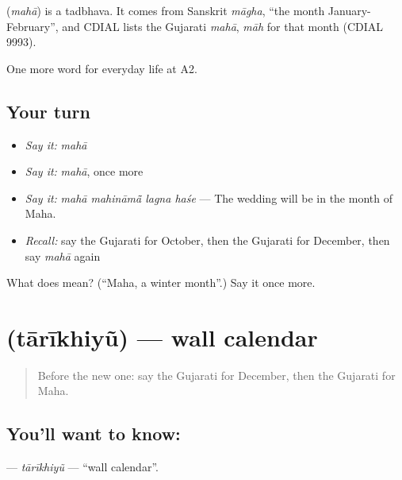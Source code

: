 \begin{cousinweb}
\textbf{} (\emph{mahā}) is a tadbhava. It comes from Sanskrit \emph{māgha}, \textquotedblleft{}the month January-February\textquotedblright{}, and CDIAL lists the Gujarati \emph{mahā}, \emph{māh} for that month (CDIAL 9993).
\end{cousinweb}

\begin{grammarlens}[title={What you've built}]
One more word for everyday life at A2.
\end{grammarlens}

\subsection*{Your turn}
\begin{itemize}
\raggedright
  \item \emph{Say it:} \emph{mahā}
  \item \emph{Say it:} \emph{mahā}, once more
  \item \emph{Say it:} \emph{mahā mahināmā̃ lagna haśe} — The wedding will be in the month of Maha.
  \item \emph{Recall:} say the Gujarati for October, then the Gujarati for December, then say \emph{mahā} again
\end{itemize}

\begin{tcolorbox}[breakable,colback=teal!4,colframe=teal!35!black,title={Before you move on}]
What does  mean? (\textquotedblleft{}Maha, a winter month\textquotedblright{}.) Say it once more.
\end{tcolorbox}
\section[\texorpdfstring{\gu{તારીખિયું} (tārīkhiyũ)}{તારીખિયું (tārīkhiyũ)}]{ (tārīkhiyũ) — wall calendar}

\label{lesson:GU-C174-tarikhiyu}



\begin{quote}
Before the new one: say the Gujarati for December, then the Gujarati for Maha.
\end{quote}

\subsection*{You'll want to know: }
\textbf{} — \emph{tārīkhiyũ} — \textquotedblleft{}wall calendar\textquotedblright{}.

